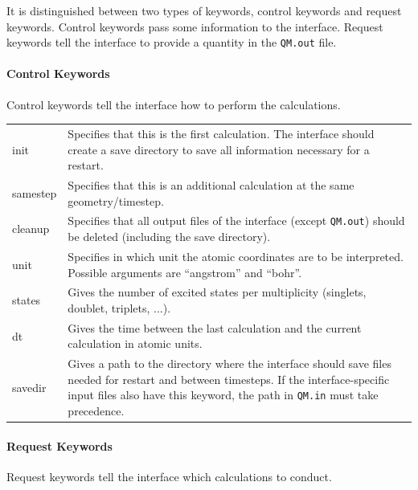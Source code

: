 \documentclass[a4paper,11pt,DIV=15,openany,twoside=false]{scrbook}
\newcommand{\ttt}[1]{\texttt{#1}}
\begin{document}
It is distinguished between two types of keywords, control keywords and request keywords. Control keywords pass some information to the interface. Request keywords tell the interface to provide a quantity in the \ttt{QM.out} file.

\paragraph{Control Keywords}

Control keywords tell the interface how to perform the calculations.

\begin{tabular}{lp{9cm}}
init            &Specifies that this is the first calculation. The interface should create a save directory to save all information necessary for a restart. \\
samestep        &Specifies that this is an additional calculation at the same geometry/timestep. \\
cleanup         &Specifies that all output files of the interface (except \ttt{QM.out}) should be deleted (including the save directory).\\
unit            &Specifies in which unit the atomic coordinates are to be interpreted. Possible arguments are ``angstrom'' and ``bohr''.\\
states          &Gives the number of excited states per multiplicity (singlets, doublet, triplets, ...).\\
dt              &Gives the time between the last calculation and the current calculation in atomic units.\\
savedir         &Gives a path to the directory where the interface should save files needed for restart and between timesteps. If the interface-specific input files also have this keyword, the path in \ttt{QM.in} must take precedence.\\
\end{tabular}


\paragraph{Request Keywords}

Request keywords tell the interface which calculations to conduct.
\end{document}
